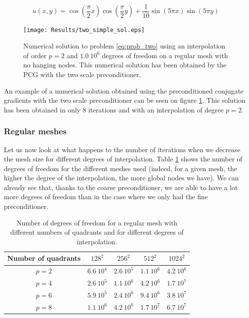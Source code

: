 $$ u(x,y) = \cos(\frac{\pi}{2}x)\cos(\frac{\pi}{2}y) + \frac{1}{10}\sin(5\pi x)\sin(5\pi y)$$

\begin{figure}
\centering
\texttt{[image: Results/two\_simple\_sol.eps]}
\caption{Numerical solution to problem \ref{eq:prob_two} using an interpolation of order $p=2$ and $1.0\:10^{6}$ degrees of freedom on a regular mesh with no hanging nodes. This numerical solution has been obtained by the PCG with the two scale preconditioner.}
\label{two_simple_sol}
\end{figure}


An example of a numerical solution obtained using the preconditioned conjugate gradients with the two scale preconditioner can be seen on figure \ref{two_simple_sol}. This solution has been obtained in only 8 iterations and with an interpolation of degree $p=2$. 

\subsubsection{Regular meshes}

Let us now look at what happens to the number of iterations when we decrease the mesh size for different degrees of interpolation. Table \ref{two_table_reg} shows the number of degrees of freedom for the different meshes used (indeed, for a given mesh, the higher the degree of the interpolation, the more global nodes we have). We can already see that, thanks to the coarse preconditioner, we are able to have a lot more degrees of freedom than in the case where we only had the fine preconditioner.

\begin{table}
\centering
\begin{tabular}{c|cccc}
\hline
Number of quadrants & $128^2$ & $256^2$ & $512^2$ & $1024^2$\\
\hline
$p=2$ & $6.6\:10^4$ & $2.6\:10^5$ & $1.1\:10^6$ & $4.2\:10^6$ \\
$p=4$ & $2.6\:10^5$ & $1.1\:10^6$ & $4.2\:10^6$ & $1.7\:10^7$ \\
$p=6$ & $5.9\:10^5$ & $2.4\:10^6$ & $9.4\:10^6$ & $3.8\:10^7$ \\
$p=8$ & $1.1\:10^6$ & $4.2\:10^6$ & $1.7\:10^7$ & $6.7\:10^7$ \\
\hline
\end{tabular}
\caption{Number of degrees of freedom for a regular mesh with different numbers of quadrants and for different degrees of interpolation.}
\label{two_table_reg}
\end{table}

